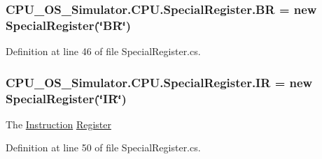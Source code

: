 \subsubsection[{B\+R}]{ C\+P\+U\+\_\+\+O\+S\+\_\+\+Simulator.\+C\+P\+U.\+Special\+Register.\+B\+R = new {\bf Special\+Register}(\char`\"{}B\+R\char`\"{})\hspace{0.3cm}{\ttfamily [static]}}\label{class_c_p_u___o_s___simulator_1_1_c_p_u_1_1_special_register_a08c44f677cc5e830000382725ce8ab9f}






Definition at line 46 of file Special\+Register.\+cs.

\hypertarget{class_c_p_u___o_s___simulator_1_1_c_p_u_1_1_special_register_a96fde61578e06f00ab7b19a4b05b9885}{}
\subsubsection[{I\+R}]{ C\+P\+U\+\_\+\+O\+S\+\_\+\+Simulator.\+C\+P\+U.\+Special\+Register.\+I\+R = new {\bf Special\+Register}(\char`\"{}I\+R\char`\"{})\hspace{0.3cm}{\ttfamily [static]}}\label{class_c_p_u___o_s___simulator_1_1_c_p_u_1_1_special_register_a96fde61578e06f00ab7b19a4b05b9885}


The \hyperlink{class_c_p_u___o_s___simulator_1_1_c_p_u_1_1_instruction}{Instruction} \hyperlink{class_c_p_u___o_s___simulator_1_1_c_p_u_1_1_register}{Register} 



Definition at line 50 of file Special\+Register.\+cs.

\hypertarget{class_c_p_u___o_s___simulator_1_1_c_p_u_1_1_special_register_a2ae89cee8b74f9985f43ee4e6f994bad}{}
